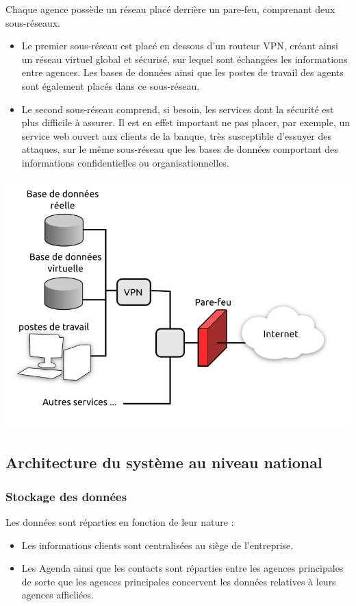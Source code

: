 \documentclass[a4paper]{article}
\begin{document}
Chaque agence possède un réseau placé derrière un pare-feu, comprenant deux sous-réseaux.
\begin{itemize}
  \item Le premier sous-réseau est placé en dessous d'un routeur VPN, créant ainsi un réseau virtuel global et sécurisé, sur lequel sont échangées les informations entre agences. Les bases de données ainsi que les postes de travail des agents sont également placés dans ce sous-réseau.
  \item Le second sous-réseau comprend, si besoin, les services dont la sécurité est plus difficile à assurer. Il est en effet important ne pas placer, par exemple, un service web ouvert aux clients de la banque, très susceptible d'essuyer des attaques, sur le même sous-réseau que les bases de données comportant des informations confidentielles ou organisationnelles. 
\end{itemize}

\includegraphics{Includes/archi_agence.png}


\subsection{Architecture du système au niveau national}
\subsubsection{ Stockage des données }

Les données sont réparties en fonction de leur nature :
\begin{itemize}
  \item Les informations clients sont centralisées au siège de l'entreprise.
  \item Les Agenda ainsi que les contacts sont réparties entre les agences principales de sorte que les agences principales concervent les données relatives à leurs agences afficliées.
\end{itemize}
  
\end{document}
